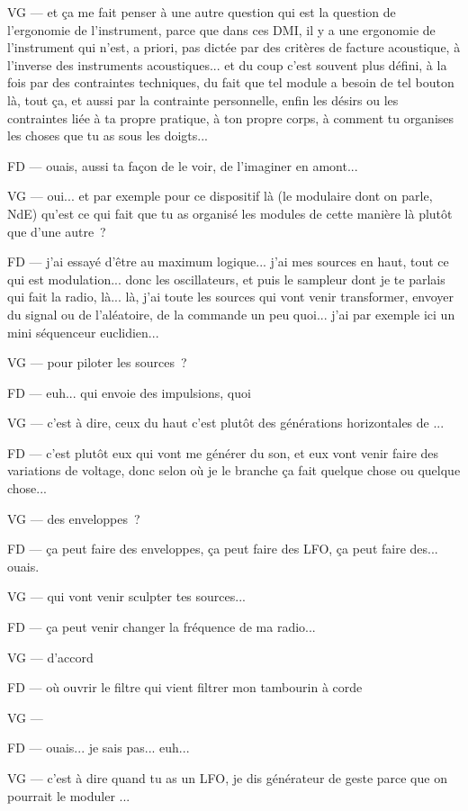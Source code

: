 VG — et ça me fait penser à une autre question qui est la question de l'ergonomie de l'instrument, parce que dans ces DMI, il y a une ergonomie de l'instrument qui n'est, a priori, pas dictée par des critères de facture acoustique, à l'inverse des instruments acoustiques... et du coup c'est souvent plus défini, à la fois par des contraintes techniques, du fait que tel module a besoin de tel bouton là, tout ça, et aussi par la contrainte personnelle, enfin les désirs ou les contraintes liée à ta propre pratique, à ton propre corps, à comment tu organises les choses que tu as sous les doigts... 

FD — ouais, aussi ta façon de le voir, de l'imaginer en amont... 

VG — oui... et par exemple pour ce dispositif là (le modulaire dont on parle, NdE) qu'est ce qui fait que tu as organisé les modules de cette manière là plutôt que d'une autre ? 

FD — j'ai essayé d'être au maximum logique... j'ai mes sources en haut, tout ce qui est modulation... donc les oscillateurs, et puis le sampleur dont je te parlais qui fait la radio, là... là, j'ai toute les sources qui vont venir transformer, envoyer du signal ou de l'aléatoire, de la commande un peu quoi... j'ai par exemple ici un mini séquenceur euclidien... 

VG — pour piloter les sources ? 

FD — euh... qui envoie des impulsions, quoi 

VG — c'est à dire, ceux du haut c'est plutôt des générations horizontales de ... 

FD — c'est plutôt eux qui vont me générer du son, et eux vont venir faire des variations de voltage, donc selon où je le branche ça fait quelque chose ou quelque chose... 

VG — des enveloppes ? 

FD — ça peut faire des enveloppes, ça peut faire des LFO, ça peut faire des... ouais. 

VG — qui vont venir sculpter tes sources... 

FD — ça peut venir changer la fréquence de ma radio... 

VG — d'accord 

FD — où ouvrir le filtre qui vient filtrer mon tambourin à corde 

VG —   

FD — ouais... je sais pas... euh... 

VG — c'est à dire quand tu as un LFO, je dis générateur de geste parce que on pourrait le moduler ... 

